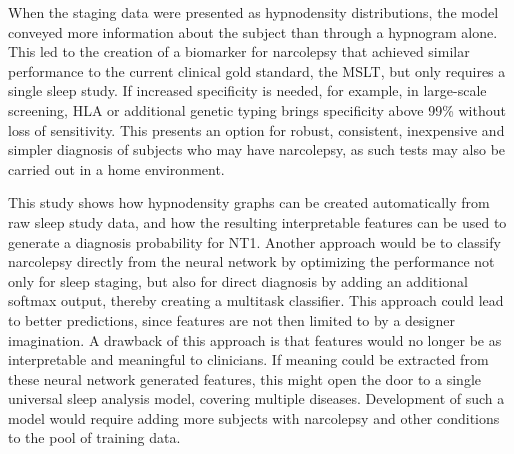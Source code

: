 When the staging data were presented as hypnodensity distributions, the model conveyed more information about the subject than through a hypnogram alone.
This led to the creation of a biomarker for narcolepsy that achieved similar performance to the current clinical gold standard, the MSLT, but only requires a single sleep study.
If increased specificity is needed, for example, in large-scale screening, HLA or additional genetic typing brings specificity above 99\% without loss of sensitivity.
This presents an option for robust, consistent, inexpensive and simpler diagnosis of subjects who may have narcolepsy, as such tests may also be carried out in a home environment.

This study shows how hypnodensity graphs can be created automatically from raw sleep study data, and how the resulting interpretable features can be used to generate a diagnosis probability for \ac{NT1}.
Another approach would be to classify narcolepsy directly from the neural network by optimizing the performance not only for sleep staging, but also for direct diagnosis by adding an additional softmax output, thereby creating a multitask classifier.
This approach could lead to better predictions, since features are not then limited to by a designer imagination. 
A drawback of this approach is that features would no longer be as interpretable and meaningful to clinicians. 
If meaning could be extracted from these neural network generated features, this might open the door to a single universal sleep analysis model, covering multiple diseases.
Development of such a model would require adding more subjects with narcolepsy and other conditions to the pool of training data.
